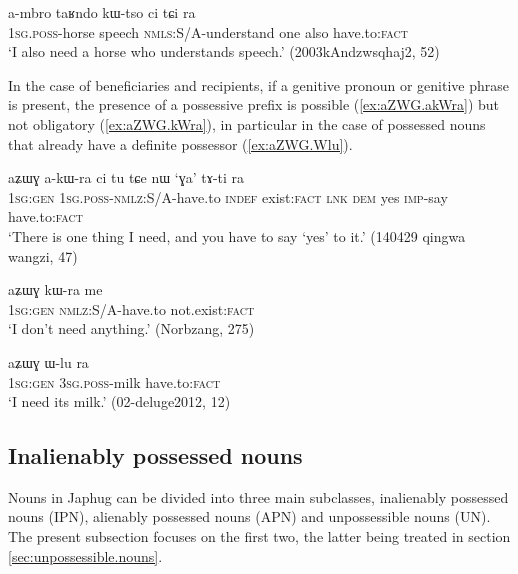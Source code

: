  \begin{exe}
\ex \label{ex:ambro.tARndo.kWtso}
\gll a-mbro taʁndo kɯ-tso ci tɕi ra \\
\textsc{1sg.poss}-horse speech \textsc{nmls}:S/A-understand one also have.to:\textsc{fact} \\
\glt `I also need a horse who understands speech.' (2003kAndzwsqhaj2, 52)
\end{exe}
In the case of beneficiaries and recipients, if a genitive pronoun or genitive phrase is present, the presence of a possessive prefix is possible (\ref{ex:aZWG.akWra}) but not obligatory (\ref{ex:aZWG.kWra}), in particular in the case of possessed nouns that already have a definite possessor (\ref{ex:aZWG.Wlu}).

 \begin{exe}
\ex \label{ex:aZWG.akWra}
\gll aʑɯɣ a-kɯ-ra ci tu tɕe nɯ `ɣa' tɤ-ti ra \\
\textsc{1sg:gen} \textsc{1sg.poss}-\textsc{nmlz}:S/A-have.to \textsc{indef} exist:\textsc{fact} \textsc{lnk} \textsc{dem} yes \textsc{imp}-say have.to:\textsc{fact} \\
\glt `There is one thing I need, and you have to say `yes' to it.' (140429 qingwa wangzi, 47)
\end{exe}

 \begin{exe}
\ex \label{ex:aZWG.kWra}
\gll  aʑɯɣ kɯ-ra me \\
\textsc{1sg:gen} \textsc{nmlz}:S/A-have.to not.exist:\textsc{fact} \\
\glt `I don't need anything.' (Norbzang, 275)
\end{exe}

 \begin{exe}
\ex \label{ex:aZWG.Wlu}
\gll aʑɯɣ ɯ-lu ra \\
\textsc{1sg:gen} \textsc{3sg.poss}-milk have.to:\textsc{fact} \\
\glt `I need its milk.' (02-deluge2012, 12)
\end{exe}

\subsection{Inalienably possessed nouns} \label{sec:inalienably.possessed}
Nouns in Japhug can be divided into three main subclasses, inalienably possessed nouns (IPN), alienably possessed nouns (APN) and unpossessible nouns (UN). The present subsection focuses on the first two, the latter being treated in section \ref{sec:unpossessible.nouns}.


